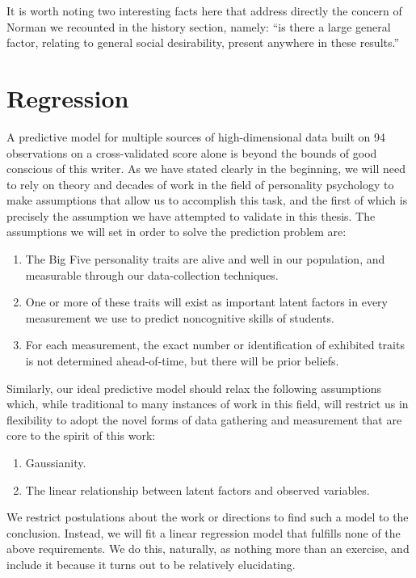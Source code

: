 \documentclass[a4paper,12pt]{article}
\begin{document}
It is worth noting two interesting facts here that address directly the concern of Norman we recounted in the history section, namely: ``is there a large general factor, relating to general social desirability, present anywhere in these results.''
\section{Regression}

A predictive model for multiple sources of high-dimensional data built on 94 observations on a cross-validated score alone is beyond the bounds of good conscious of this writer. As we have stated clearly in the beginning, we will need to rely on theory and decades of work in the field of personality psychology to make assumptions that allow us to accomplish this task, and the first of which is precisely the assumption we have attempted to validate in this thesis. The assumptions we will set in order to solve the prediction problem are:


\begin{enumerate}
\item The Big Five personality traits are alive and well in our population, and measurable through our data-collection techniques.

\item One or more of these traits will exist as important latent factors in every measurement we use to predict noncognitive skills of students.

\item For each measurement, the exact number or identification of exhibited traits is not determined ahead-of-time, but there will be prior beliefs.
\end{enumerate}

Similarly, our ideal predictive model should relax the following assumptions which, while traditional to many instances of work in this field, will restrict us in flexibility to adopt the novel forms of data gathering and measurement that are core to the spirit of this work:

\begin{enumerate}
\item Gaussianity.
\item The linear relationship between latent factors and observed variables.
\end{enumerate}

We restrict postulations about the work or directions to find such a model to the conclusion. Instead, we will fit a linear regression model that fulfills none of the above requirements. We do this, naturally, as nothing more than an exercise, and include it because it turns out to be relatively elucidating.
\end{document}
